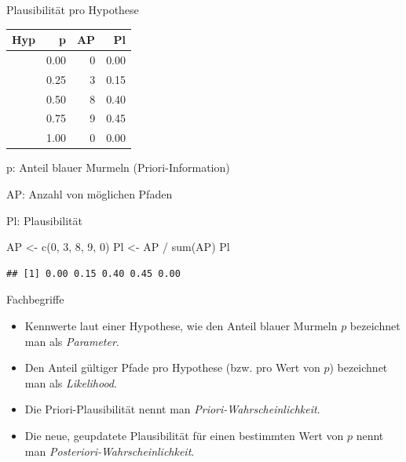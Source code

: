 \documentclass[
  ngerman,
  ignorenonframetext,
]{beamer}
\newenvironment{Shaded}{\begin{snugshade}}{\end{snugshade}}
\newcommand{\DecValTok}[1]{\textcolor[rgb]{0.00,0.00,0.81}{#1}}
\newcommand{\FunctionTok}[1]{\textcolor[rgb]{0.00,0.00,0.00}{#1}}
\newcommand{\NormalTok}[1]{#1}
\newcommand{\OtherTok}[1]{\textcolor[rgb]{0.56,0.35,0.01}{#1}}
\newcommand{\SpecialCharTok}[1]{\textcolor[rgb]{0.00,0.00,0.00}{#1}}
\begin{document}
\begin{frame}[fragile]{Plausibilität pro Hypothese}
\protect\hypertarget{plausibilituxe4t-pro-hypothese}{}
\begin{tabular}{l|r|r|r}
\hline
Hyp & p & AP & Pl\\
\hline
[W W W W] & 0.00 & 0 & 0.00\\
\hline
[B W W W] & 0.25 & 3 & 0.15\\
\hline
[B B W W] & 0.50 & 8 & 0.40\\
\hline
[B B B W] & 0.75 & 9 & 0.45\\
\hline
[B B B B] & 1.00 & 0 & 0.00\\
\hline
\end{tabular}

p: Anteil blauer Murmeln (Priori-Information)

AP: Anzahl von möglichen Pfaden

Pl: Plausibilität

\begin{Shaded}
\begin{Highlighting}[]
\NormalTok{AP }\OtherTok{\textless{}{-}} \FunctionTok{c}\NormalTok{(}\DecValTok{0}\NormalTok{, }\DecValTok{3}\NormalTok{, }\DecValTok{8}\NormalTok{, }\DecValTok{9}\NormalTok{, }\DecValTok{0}\NormalTok{)}
\NormalTok{Pl }\OtherTok{\textless{}{-}}\NormalTok{ AP }\SpecialCharTok{/} \FunctionTok{sum}\NormalTok{(AP)}
\NormalTok{Pl}
\end{Highlighting}
\end{Shaded}

\begin{verbatim}
## [1] 0.00 0.15 0.40 0.45 0.00
\end{verbatim}
\end{frame}

\begin{frame}{Fachbegriffe}
\protect\hypertarget{fachbegriffe}{}
\begin{itemize}
\item
  Kennwerte laut einer Hypothese, wie den Anteil blauer Murmeln \(p\)
  bezeichnet man als \emph{Parameter}.
\item
  Den Anteil gültiger Pfade pro Hypothese (bzw. pro Wert von \(p\))
  bezeichnet man als \emph{Likelihood}.
\item
  Die Priori-Plausibilität nennt man \emph{Priori-Wahrscheinlichkeit}.
\item
  Die neue, geupdatete Plausibilität für einen bestimmten Wert von \(p\)
  nennt man \emph{Posteriori-Wahrscheinlichkeit}.
\end{itemize}
\end{frame}
\end{document}
